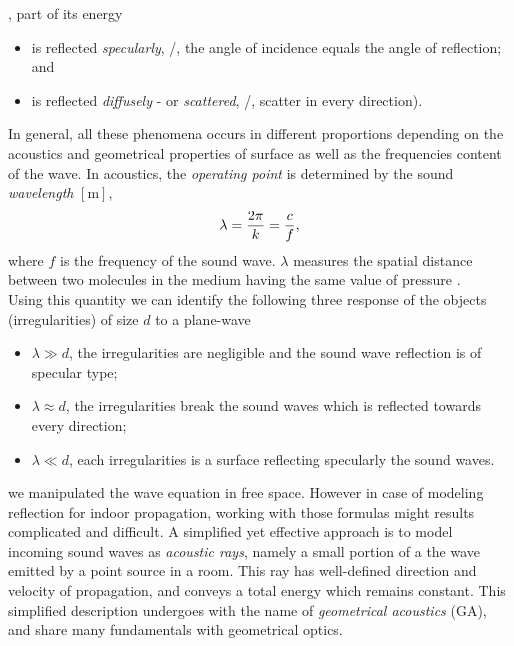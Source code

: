 , part of its energy
\begin{itemize}
    \item is reflected \textit{specularly}, \ie/, the angle of incidence equals the angle of reflection; and
    \item is reflected \textit{diffusely} - or \textit{scattered}, \ie/, scatter in every direction).
\end{itemize}


In general, all these phenomena occurs in different proportions depending on the acoustics and geometrical properties of surface as well as
the frequencies content of the wave.
In acoustics, the \textit{operating point} is determined by the sound \textit{wavelength} $[\si{\metre}]$,
\begin{equation}
    \lambda = \frac{2 \pi}{k} = \frac{c}{f}
    ,
\end{equation}
where $f$ is the frequency of the sound wave.
$\lambda$ measures the spatial distance between two molecules in the medium having the same value of pressure
.
\\Using this quantity we can identify the following three response of the objects (irregularities) of size $d$ to a plane-wave
\begin{itemize}
    \item $\lambda \gg d$, the irregularities are negligible and the sound wave reflection is of specular type;
    \item $\lambda \approx d$, the irregularities break the sound waves which is reflected towards every direction;
    \item $\lambda \ll d$, each irregularities is a surface reflecting specularly the sound waves.
\end{itemize}


 we manipulated the wave equation in free space.
However in case of modeling reflection for indoor propagation, working with those formulas might results complicated and difficult.
A simplified yet effective approach is to model incoming sound waves as \textit{acoustic rays}, namely
a small portion of a the wave emitted by a point source in a room.
This ray has well-defined direction and velocity of propagation, and conveys a total energy which remains constant.
This simplified description undergoes with the name of \textit{geometrical acoustics} (GA), and share many fundamentals with geometrical optics.

